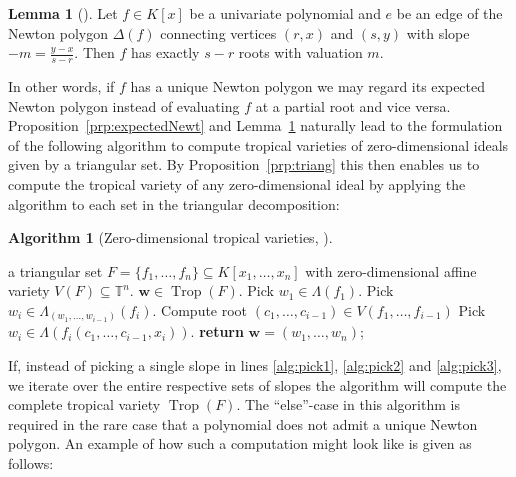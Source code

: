 \documentclass[
  paper=a4,
  titlepage,
  bibliography=totoc,
  listof=totoc,
  pagesize=pdftex
]{scrartcl}
\numberwithin{figure}{section}
\numberwithin{equation}{section}
\numberwithin{table}{section}
\newcommand*\setT{\mathds{T}}
\let\vec\mathbf
\DeclareMathOperator{\Trop}{Trop}
\theoremstyle{definition}
\newtheorem{lemma}[definition]{Lemma}
\newtheorem{algo}[definition]{Algorithm}
\numberwithin{definition}{section}
\begin{document}
\begin{lemma}[{\cite[Proposition~II.6.3]{neuAlg}}]
  Let $f \in K[x]$ be a univariate polynomial and $e$ be an edge of the Newton polygon
  $\Delta(f)$ connecting vertices $(r,x)$ and $(s, y)$ with slope $-m = \frac{y-x}{s-r}$.
  Then $f$ has exactly $s-r$ roots with valuation $m$.
  \label{lem:newtPolyRoots}
\end{lemma}

In other words, if $f$ has a unique Newton polygon we may regard its expected Newton
polygon instead of evaluating $f$ at a partial root and vice versa.
Proposition~\ref{prp:expectedNewt} and Lemma~\ref{lem:newtPolyRoots} naturally lead to the
formulation of the following algorithm to compute tropical varieties of zero-dimensional
ideals given by a triangular set. By Proposition~\ref{prp:triang} this then enables us to
compute the tropical variety of any zero-dimensional ideal by applying the algorithm to
each set in the triangular decomposition:

\begin{algo}[Zero-dimensional tropical varieties,
  {\cite[Algorithm~2.10]{tropPointsLinks}}] $ $
  \begin{algorithmic}[1]
    \Require a triangular set $F = \{f_1, \dots, f_n\} \subseteq K[x_1, \dots, x_n]$ with
    zero-dimensional affine variety $V(F) \subseteq \setT^n$.
    \Ensure $\vec w \in \Trop(F)$.
    \State Pick $w_1 \in \Lambda(f_1)$.
    \label{alg:pick1}
        \State Pick $w_i \in \Lambda_{(w_1, \dots, w_{i-1})}(f_i)$.
        \label{alg:pick2}
      \Else
        \State Compute root $(c_1, \dots, c_{i-1}) \in V(f_1, \dots, f_{i-1})$
        \State Pick $w_i \in \Lambda(f_i(c_1, \dots, c_{i-1}, x_i))$.
        \label{alg:pick3}
      \EndIf
    \EndFor
    \State \textbf{return} $\vec w = (w_1, \dots, w_n)$;
  \end{algorithmic}
  \label{alg:zeroDimTrop}
\end{algo}

If, instead of picking a single slope in lines \ref{alg:pick1}, \ref{alg:pick2} and
\ref{alg:pick3}, we iterate over the entire respective sets of slopes the algorithm will
compute the complete tropical variety $\Trop(F)$. The \enquote{else}-case in this
algorithm is required in the rare case that a polynomial does not admit a unique Newton
polygon. An example of how such a computation might look like is given as follows:
\end{document}
